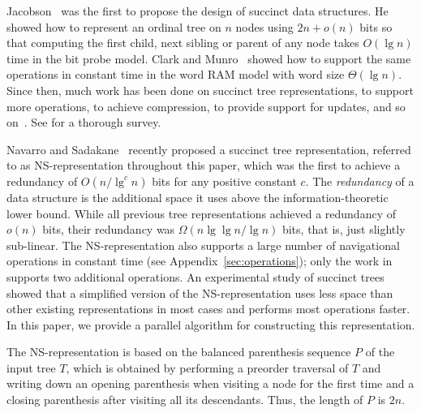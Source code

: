 Jacobson~\cite{j1989} was the first to propose the design of succinct data
structures.  He showed how to represent an ordinal tree on $n$ nodes
using $2n+o(n)$ bits so that computing the first child, next sibling
or parent of any node takes $O(\lg n)$ time in the bit probe
model.  Clark and Munro~\cite{cm1996} showed how to support the same
operations in constant time in the word RAM model with word size
$\Theta(\lg n)$.  Since then, much work has been done on succinct tree
representations, to support more operations, to achieve compression,
to provide support for updates, and so
on~\cite{mr1997,bdmr1999,grr2004,jss2007,ly2008,hms2012,fm2014,Navarro:2014:FFS:2620785.2601073}.
See \cite{rr2013} for a thorough survey.

Navarro and Sadakane~\cite{Navarro:2014:FFS:2620785.2601073} recently
proposed a succinct tree representation, referred to as
NS-representation throughout this paper, which was the first to
achieve a redundancy of $O(n/\lg^c n)$ bits for any positive constant
$c$.  The \emph{redundancy} of a data structure is the additional
space it uses above the information-theoretic lower bound.  While all
previous tree representations achieved a redundancy of $o(n)$ bits,
their redundancy was $\Omega(n \lg\lg n / \lg n)$ bits, that is, just
slightly sub-linear.  The NS-representation also supports a large
number of navigational operations in constant time (see
Appendix~\ref{sec:operations});
only the work in \cite{hms2012,fm2014} supports two additional operations.
An experimental study of succinct trees~\cite{ACNSalenex10} showed that a
simplified version of the NS-representation uses less space than other
existing representations in most cases and performs most operations
faster.  In this paper, we provide a parallel algorithm for
constructing this representation.

The NS-representation is based on the balanced parenthesis sequence
$P$ of the input tree $T$, which is obtained by performing a preorder
traversal of $T$ and writing down an opening parenthesis when visiting a node
for the first time and a closing parenthesis after visiting all
its descendants.  Thus, the length of $P$ is $2n$.

